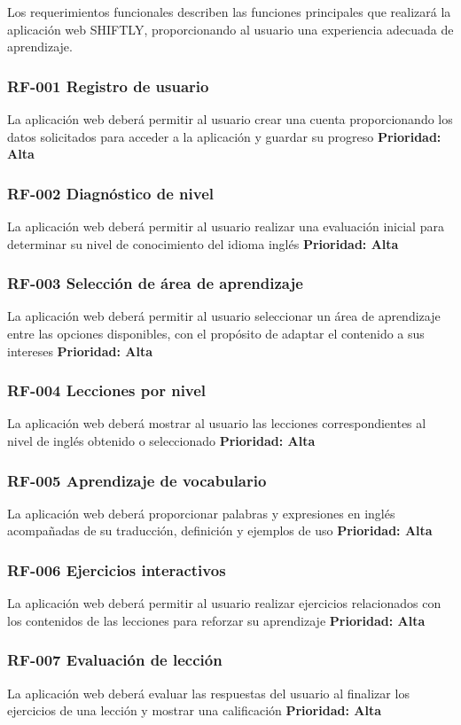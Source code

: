 Los requerimientos funcionales describen las funciones principales que
realizará la aplicación web SHIFTLY, proporcionando al usuario una
experiencia adecuada de aprendizaje.
\subsubsection{RF-001 Registro de usuario}
La aplicación web deberá permitir al usuario crear una cuenta
proporcionando los datos solicitados para acceder a la aplicación y
guardar su progreso
\textbf{Prioridad: Alta}
\subsubsection{RF-002 Diagnóstico de nivel}
La aplicación web deberá permitir al usuario realizar una evaluación
inicial para determinar su nivel de conocimiento del idioma inglés
\textbf{Prioridad: Alta}
\subsubsection{RF-003 Selección de área de aprendizaje}
La aplicación web deberá permitir al usuario seleccionar un área de
aprendizaje entre las opciones disponibles, con el propósito de adaptar
el contenido a sus intereses
\textbf{Prioridad: Alta}
\subsubsection{RF-004 Lecciones por nivel}
La aplicación web deberá mostrar al usuario las lecciones correspondientes
al nivel de inglés obtenido o seleccionado
\textbf{Prioridad: Alta}
\subsubsection{RF-005 Aprendizaje de vocabulario}
La aplicación web deberá proporcionar palabras y expresiones en inglés
acompañadas de su traducción, definición y ejemplos de uso
\textbf{Prioridad: Alta}
\subsubsection{RF-006 Ejercicios interactivos}
La aplicación web deberá permitir al usuario realizar ejercicios
relacionados con los contenidos de las lecciones para reforzar su
aprendizaje
\textbf{Prioridad: Alta}
\subsubsection{RF-007 Evaluación de lección}
La aplicación web deberá evaluar las respuestas del usuario al finalizar
los ejercicios de una lección y mostrar una calificación
\textbf{Prioridad: Alta}
